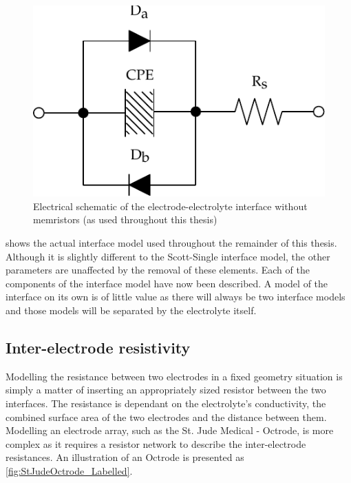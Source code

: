       \begin{figure}
        \centering
        \includegraphics{content/pt2/07-InterfaceModel/graphics/interfaceSchematic_noMemristive}
        \caption{\label{fig:pt2-interfaceSchematic_noMemristive}Electrical schematic of the electrode-electrolyte interface without memristors (as used throughout this thesis)}
      \end{figure}

       shows the actual interface model used throughout the remainder of this thesis.
      Although it is slightly different to the Scott-Single interface model, the other parameters are unaffected by the removal of these elements.
      Each of the components of the interface model have now been described.
      A model of the interface on its own is of little value as there will always be two interface models and those models will be separated by the electrolyte itself.


  \subsection{Inter-electrode resistivity}

    Modelling the resistance between two electrodes in a fixed geometry situation is simply a matter of inserting an appropriately sized resistor between the two interfaces.
    The resistance is dependant on the electrolyte's conductivity, the combined surface area of the two electrodes and the distance between them.
    Modelling an electrode array, such as the St. Jude Medical - Octrode, is more complex as it requires a resistor network to describe the inter-electrode resistances.
    An illustration of an Octrode is presented as \cref{fig:StJudeOctrode_Labelled}.

